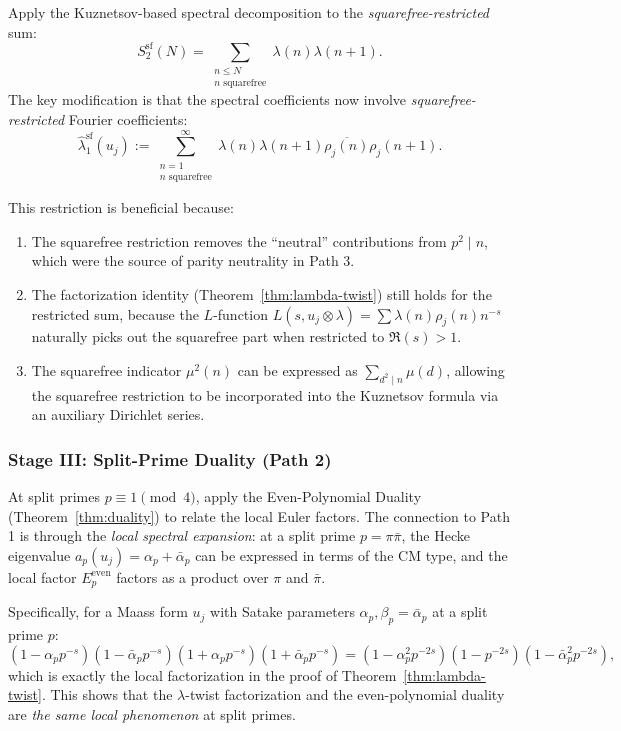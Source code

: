 \documentclass[11pt,a4paper]{article}
\theoremstyle{plain}
\theoremstyle{definition}
\begin{document}
Apply the Kuznetsov-based spectral decomposition to the \emph{squarefree-restricted} sum:
\[
S_2^{\mathrm{sf}}(N) = \sum_{\substack{n \leq N \\ n \text{ squarefree}}} \lambda(n)\lambda(n+1).
\]
The key modification is that the spectral coefficients now involve \emph{squarefree-restricted} Fourier coefficients:
\[
\hat{\lambda}_1^{\mathrm{sf}}(u_j) := \sum_{\substack{n=1 \\ n \text{ squarefree}}}^\infty \lambda(n)\lambda(n+1) \overline{\rho_j(n)} \rho_j(n+1).
\]

This restriction is beneficial because:
\begin{enumerate}
\item The squarefree restriction removes the ``neutral'' contributions from $p^2 \mid n$, which were the source of parity neutrality in Path 3.
\item The factorization identity (Theorem~\ref{thm:lambda-twist}) still holds for the restricted sum, because the $L$-function $L(s, u_j \otimes \lambda) = \sum \lambda(n)\rho_j(n) n^{-s}$ naturally picks out the squarefree part when restricted to $\Re(s) > 1$.
\item The squarefree indicator $\mu^2(n)$ can be expressed as $\sum_{d^2 \mid n} \mu(d)$, allowing the squarefree restriction to be incorporated into the Kuznetsov formula via an auxiliary Dirichlet series.
\end{enumerate}

\subsubsection{Stage III: Split-Prime Duality (Path 2)}

At split primes $p \equiv 1 \pmod{4}$, apply the Even-Polynomial Duality (Theorem~\ref{thm:duality}) to relate the local Euler factors. The connection to Path 1 is through the \emph{local spectral expansion}: at a split prime $p = \pi\bar{\pi}$, the Hecke eigenvalue $a_p(u_j) = \alpha_p + \bar{\alpha}_p$ can be expressed in terms of the CM type, and the local factor $E_p^{\mathrm{even}}$ factors as a product over $\pi$ and $\bar{\pi}$.

Specifically, for a Maass form $u_j$ with Satake parameters $\alpha_p, \beta_p = \bar{\alpha}_p$ at a split prime $p$:
\begin{equation}
\label{eq:split-prime-local}
(1 - \alpha_p p^{-s})(1 - \bar{\alpha}_p p^{-s})(1 + \alpha_p p^{-s})(1 + \bar{\alpha}_p p^{-s}) = (1 - \alpha_p^2 p^{-2s})(1 - p^{-2s})(1 - \bar{\alpha}_p^2 p^{-2s}),
\end{equation}
which is exactly the local factorization in the proof of Theorem~\ref{thm:lambda-twist}. This shows that the $\lambda$-twist factorization and the even-polynomial duality are \emph{the same local phenomenon} at split primes.
\end{document}
